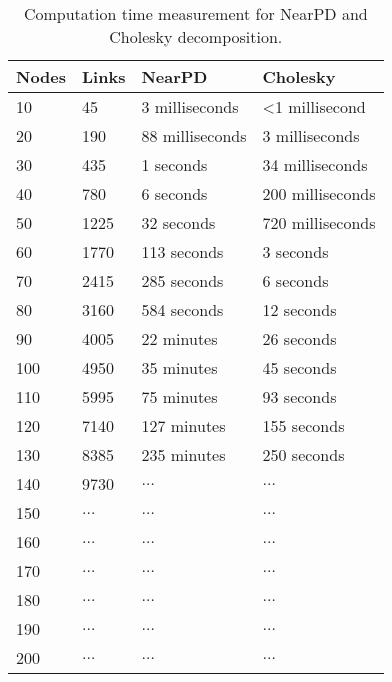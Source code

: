 \begin{table}[H]
    \centering
    \begin{tabular}{|l|l|l|l|}
        \hline
        Nodes & Links   & NearPD          & Cholesky                 \\\hline
        10    & 45      & 3 milliseconds  & \textless{}1 millisecond \\\hline
        20    & 190     & 88 milliseconds & 3 milliseconds           \\\hline
        30    & 435     & 1 seconds       & 34 milliseconds          \\\hline
        40    & 780     & 6 seconds       & 200 milliseconds         \\\hline
        50    & 1225    & 32 seconds      & 720 milliseconds         \\\hline
        60    & 1770    & 113 seconds     & 3 seconds                \\\hline
        70    & 2415    & 285 seconds     & 6 seconds                \\\hline
        80    & 3160    & 584 seconds     & 12 seconds               \\\hline
        90    & 4005    & 22 minutes      & 26 seconds               \\\hline
        100   & 4950    & 35 minutes      & 45 seconds               \\\hline
        110   & 5995    & 75 minutes      & 93 seconds               \\\hline
        120   & 7140    & 127 minutes     & 155 seconds              \\\hline
        130   & 8385    & 235 minutes     & 250 seconds              \\\hline
        140   & 9730    & $\dots$         & $\dots$                  \\\hline
        150   & $\dots$ & $\dots$         & $\dots$                  \\\hline
        160   & $\dots$ & $\dots$         & $\dots$                  \\\hline
        170   & $\dots$ & $\dots$         & $\dots$                  \\\hline
        180   & $\dots$ & $\dots$         & $\dots$                  \\\hline
        190   & $\dots$ & $\dots$         & $\dots$                  \\\hline
        200   & $\dots$ & $\dots$         & $\dots$                  \\\hline
    \end{tabular}
    \caption{Computation time measurement for NearPD and Cholesky decomposition.}
    \label{table:spdcholeskytime}
\end{table}

